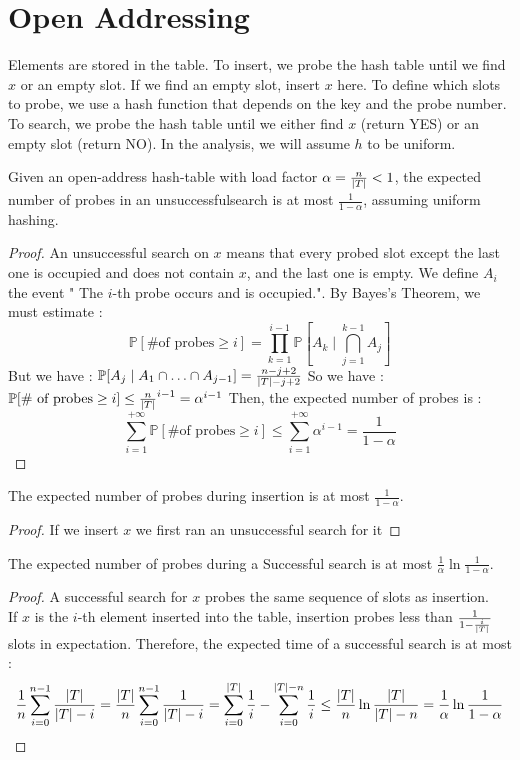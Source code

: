 \documentclass[12pt]{cours}
\begin{document}
\section{Open Addressing}
Elements are stored in the table. To insert, we probe the hash table until we find $x$ or an empty slot. If we find an empty slot, insert $x$ here. To define which slots to probe, we use a hash function that depends on the key and the probe number. To search, we probe the hash table until we either find $x$ (return YES) or an empty slot (return NO). In the analysis, we will assume $h$ to be uniform.

\begin{theorem}[Analysis]
    Given an open-address hash-table with load factor $\alpha = \frac{n}{\left|T\right|} < 1$, the expected number of probes in an unsuccessfulsearch is at most $\frac{1}{1-\alpha}$, assuming uniform hashing.
\end{theorem}
\begin{proof}
    An unsuccessful search on $x$ means that every probed slot except the last one is occupied and does not contain $x$, and the last one is empty.
    We define $A_{i}$ the event " The $i$-th probe occurs and is occupied.". By Bayes's Theorem, we must estimate :
    \[
        \mathbb{P}[\text{\# of probes} \geq i] = \prod_{k = 1}^{i - 1} \mathbb{P}[A_{k} \mid \bigcap\limits_{j = 1}^{k - 1} A_{j}]
    \]
    But we have : $\mathbb{P}[A_{j}\mid A_{1} \cap \ldots \cap A_{j - 1}] = \frac{n - j + 2}{\left|T\right| - j + 2}$
    So we have : $\mathbb{P}[\text{\# of probes} \geq i] \leq \frac{n}{\left|T\right|}^{i - 1} = \alpha^{i - 1}$
    Then, the expected number of probes is :
    \[
        \sum_{i = 1}^{+\infty} \mathbb{P}[\text{\# of probes} \geq i] \leq \sum_{i = 1}^{+\infty} \alpha^{i - 1} = \frac{1}{1 - \alpha}
    \]
\end{proof}
\begin{corollary}
    The expected number of probes during insertion is at most $\frac{1}{1 - \alpha}$.
\end{corollary}
\begin{proof}
    If we insert $x$ we first ran an unsuccessful search for it
\end{proof}

\begin{theorem}
    The expected number of probes during a Successful search is at most $\frac{1}{\alpha}\ln\frac{1}{1- \alpha}$.
\end{theorem}
\begin{proof}
    A successful search for $x$ probes the same sequence of slots as insertion.\\
    If $x$ is the $i$-th element inserted into the table, insertion probes less than $\frac{1}{1 - \frac{i}{\left|T\right|}}$ slots in expectation.
    Therefore, the expected time of a successful search is at most :
    \[
        \frac{1}{n}\sum_{i = 0}^{n - 1}\frac{\left|T\right|}{\left|T\right| - i} = \frac{\left|T\right|}{n}\sum_{i = 0}^{n - 1}\frac{1}{\left|T\right| - i} = \sum_{i = 0}^{\left|T\right|}\frac{1}{i} - \sum_{i = 0}^{\left|T\right|-n} \frac{1}{i} \leq \frac{\left|T\right|}{n}\ln\frac{\left|T\right|}{\left|T\right| - n} = \frac{1}{\alpha}\ln\frac{1}{1 - \alpha}
    \]
\end{proof}
\end{document}
